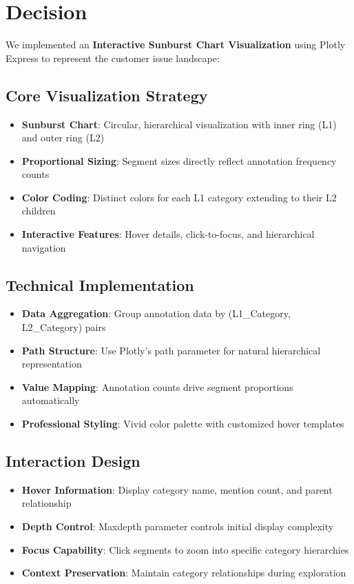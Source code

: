 \documentclass[11pt]{article}
\begin{document}
\section{Decision}

We implemented an \textbf{Interactive Sunburst Chart Visualization} using Plotly Express to represent the customer issue landscape:

\subsection{Core Visualization Strategy}
\begin{itemize}
\item \textbf{Sunburst Chart}: Circular, hierarchical visualization with inner ring (L1) and outer ring (L2)
\item \textbf{Proportional Sizing}: Segment sizes directly reflect annotation frequency counts
\item \textbf{Color Coding}: Distinct colors for each L1 category extending to their L2 children
\item \textbf{Interactive Features}: Hover details, click-to-focus, and hierarchical navigation
\end{itemize}

\subsection{Technical Implementation}
\begin{itemize}
\item \textbf{Data Aggregation}: Group annotation data by (L1\_Category, L2\_Category) pairs
\item \textbf{Path Structure}: Use Plotly's path parameter for natural hierarchical representation
\item \textbf{Value Mapping}: Annotation counts drive segment proportions automatically
\item \textbf{Professional Styling}: Vivid color palette with customized hover templates
\end{itemize}

\subsection{Interaction Design}
\begin{itemize}
\item \textbf{Hover Information}: Display category name, mention count, and parent relationship
\item \textbf{Depth Control}: Maxdepth parameter controls initial display complexity
\item \textbf{Focus Capability}: Click segments to zoom into specific category hierarchies
\item \textbf{Context Preservation}: Maintain category relationships during exploration
\end{itemize}
\end{document}
